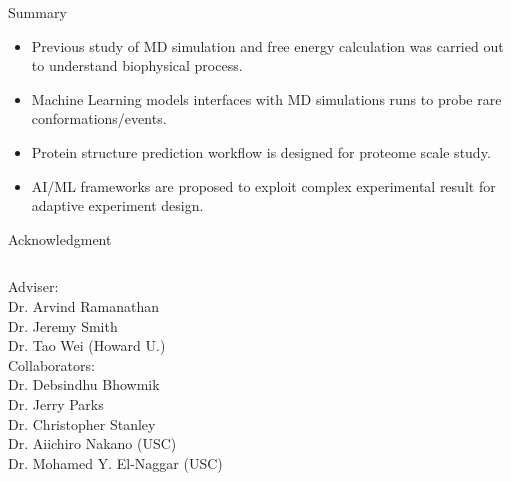 \documentclass{beamer}
\begin{document}
\begin{frame}{Summary}
\begin{itemize}
	\item Previous study of MD simulation and free energy calculation was carried out to understand biophysical process. 
	\item Machine Learning models interfaces with MD simulations runs to probe rare conformations/events. 
	\item Protein structure prediction workflow is designed for proteome scale study.  
	\item AI/ML frameworks are proposed to exploit complex experimental result for adaptive experiment design. 
\end{itemize}
\end{frame}

\begin{frame}{Acknowledgment}
\vspace{-.5cm}
\begin{columns}
	Adviser: \\ 
	\hspace{.5 cm} Dr. Arvind Ramanathan \\
	\hspace{.5 cm} Dr. Jeremy Smith \\
	\hspace{.5 cm} Dr. Tao Wei (Howard U.)\\ 
	Collaborators: \\ 
	\hspace{.5 cm} Dr. Debsindhu Bhowmik \\
	\hspace{.5 cm} Dr. Jerry Parks \\ 
	\hspace{.5 cm} Dr. Christopher Stanley \\
	\hspace{.5 cm} Dr. Aiichiro Nakano (USC)\\
	\hspace{.5 cm} Dr. Mohamed Y. El-Naggar (USC)\\
	

\end{columns}
\end{frame}
\end{document}
